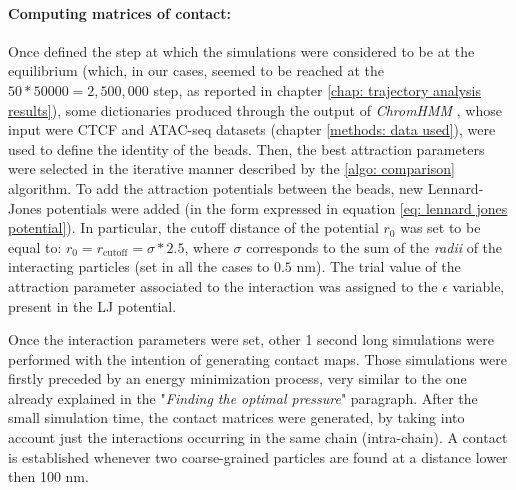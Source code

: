 
\paragraph{Computing matrices of contact:}

Once defined the step at which the simulations were considered to be at the equilibrium (which, in our cases, seemed to be reached at the $50 * 50000 = 2,500,000$ step, as reported in chapter \ref{chap: trajectory analysis results}), some dictionaries produced through the output of \textit{ChromHMM} 
\cite{chilledhousevibesLearningChromatinStates2015,ernstChromatinstateDiscoveryGenome2017}
, whose input were CTCF and ATAC-seq datasets (chapter \ref{methods: data used}), were used to define the identity of the beads. Then, the best attraction parameters were selected in the iterative manner described by the \ref{algo: comparison} algorithm. To add the attraction potentials between the beads, new Lennard-Jones potentials were added (in the form expressed in equation \ref{eq: lennard jones potential}). In particular, the cutoff distance of the potential $r_0$ was set to be equal to: $r_0 = r_{\text{cutoff}} = \sigma * 2.5$, where $\sigma$ corresponds to the sum of the \textit{radii} of the interacting particles (set in all the cases to $0.5$ nm). The trial value of the attraction parameter associated to the interaction was assigned to the $\epsilon$ variable, present in the LJ potential.



Once the interaction parameters were set, other 1 second long simulations were performed with the intention of generating contact maps. Those simulations were firstly preceded by an energy minimization process, very similar to the one already explained in the "\textit{Finding the optimal pressure}" paragraph. After the small simulation time, the contact matrices were generated, by taking into account just the interactions occurring in the same chain (intra-chain). A contact is established whenever two coarse-grained particles are found at a distance lower then 100 nm.


